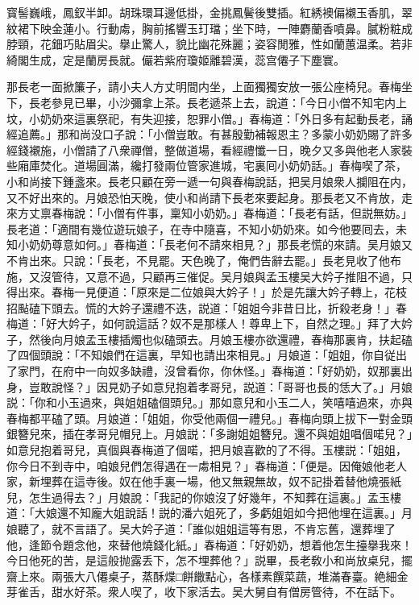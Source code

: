 寳髻巍峨，鳳釵半卸。胡珠環耳邊低掛，金挑鳳鬢後雙插。紅綉襖偏襯玉香肌，翠紋裙下映金蓮小。行動䖏，胸前搖響玉玎璫；坐下時，一陣麝蘭香噴鼻。膩粉粧成脖頸，花鈿巧貼眉尖。擧止驚人，貌比幽花殊麗；姿容閒雅，性如蘭蕙温柔。若非綺閣生成，定是蘭房長就。儼若紫府瓊姬離碧漢，蕊宫僊子下塵寰。

那長老一面掀簾子，請小夫人方丈明間内坐，上面獨獨安放一張公座椅兒。春梅坐下，長老參見已畢，小沙彌拿上茶。長老遞茶上去，說道：「今日小僧不知宅内上坟，小奶奶來這裏祭祀，有失迎接，恕罪小僧。」春梅道：「外日多有起動長老，誦經追薦。」那和尚没口子說：「小僧豈敢。有甚殷勤補報恩主？多蒙小奶奶賜了許多經錢襯施，小僧請了八衆禪僧，整做道場，看經禮懺一日，晚夕又多與他老人家裝些廂庫焚化。道場圓滿，纔打發兩位管家進城，宅裏囘小奶奶話。」春梅喫了茶，小和尚接下鍾盞來。長老只顧在旁一遞一句與春梅說話，把吴月娘衆人攔阻在内，又不好出來的。月娘恐怕天晚，使小和尚請下長老來要起身。那長老又不肯放，走來方丈禀春梅說：「小僧有件事，稟知小奶奶。」春梅道：「長老有話，但説無妨。」長老道：「適間有幾位遊玩娘子，在寺中隨喜，不知小奶奶來。如今他要囘去，未知小奶奶尊意如何。」春梅道：「長老何不請來相見？」那長老慌的來請。吴月娘又不肯出來。只說：「長老，不見罷。天色晚了，俺們告辭去罷。」長老見收了他布施，又沒管待，又意不過，只顧再三催促。吴月娘與孟玉樓吴大妗子推阻不過，只得出來。春梅一見便道：「原來是二位娘與大妗子！」於是先讓大妗子轉上，花枝招颭磕下頭去。慌的大妗子還禮不迭，説道：「姐姐今非昔日比，折殺老身！」春梅道：「好大妗子，如何說這話？奴不是那樣人！尊卑上下，自然之理。」拜了大妗子，然後向月娘孟玉樓插燭也似磕頭去。月娘玉樓亦欲還禮，春梅那裏肯，扶起磕了四個頭說：「不知娘們在這裏，早知也請出來相見。」月娘道：「姐姐，你自従出了家門，在府中一向奴多缺禮，沒曾看你，你休怪。」春梅道：「好奶奶，奴那裏出身，豈敢說怪？」因見奶子如意兒抱着孝哥兒，説道：「哥哥也長的恁大了。」月娘説：「你和小玉過來，與姐姐磕個頭兒。」那如意兒和小玉二人，笑嘻嘻過來，亦與春梅都平磕了頭。月娘道：「姐姐，你受他兩個一禮兒。」春梅向頭上拔下一對金頭銀簪兒來，插在孝哥兒帽兒上。月娘説：「多謝姐姐簪兒。還不與姐姐唱個喏兒？」如意兒抱着哥兒，真個與春梅道了個喏，把月娘喜歡的了不得。玉樓説：「姐姐，你今日不到寺中，咱娘兒們怎得遇在一䖏相見？」春梅道：「便是。因俺娘他老人家，新埋葬在這寺後。奴在他手裏一場，他又無親無故，奴不記掛着替他燒張紙兒，怎生過得去？」月娘說：「我記的你娘沒了好幾年，不知葬在這裏。」孟玉樓道：「大娘還不知龐大姐說話！説的潘六姐死了，多虧姐姐如今把他埋在這裏。」月娘聽了，就不言語了。吴大妗子道：「誰似姐姐這等有恩，不肯忘舊，還葬埋了他，逢節令題念他，來替他燒錢化紙。」春梅道：「好奶奶，想着他怎生擡擧我來！今日他死的苦，是這般抛露丢下，怎不埋葬他？」説畢，長老敎小和尚放桌兒，擺齋上來。兩張大八僊桌子，蒸酥煠□餅饊點心，各樣素饌菜蔬，堆滿春臺。絶細金芽雀舌，甜水好茶。衆人喫了，收下家活去。吴大舅自有僧房管待，不在話下。

